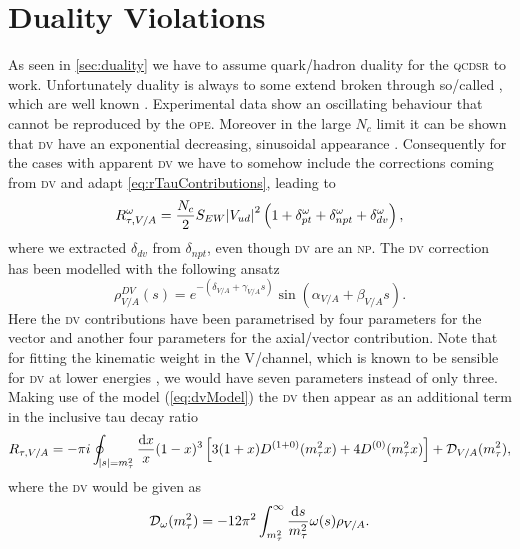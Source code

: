 \documentclass[../../index.tex]{subfiles}
\begin{document}
\section{Duality Violations}
As seen in \cref{sec:duality} we have to assume quark\-/hadron duality for the
\textsc{qcdsr} to work. Unfortunately duality is always to some extend broken
through so\-/called , which are well known
\cite{Cata2008,Cata2009}. Experimental data show an oscillating behaviour that
cannot be reproduced by the \textsc{ope}. Moreover in the large \(N_c\) limit it
can be shown that \textsc{dv} have an exponential decreasing, sinusoidal
appearance \cite{Cata2005}. Consequently for the cases with apparent \textsc{dv}
we have to somehow include the corrections coming from \textsc{dv} and adapt
\cref{eq:rTauContributions}, leading to
\begin{equation}
  R_{\tau,V/A}^\omega = \frac{N_c}{2}S_{EW} \abs{V_{ud}}^2 \left( 1 + \delta_{pt}^{\omega} + \delta_{npt}^{\omega} + \delta_{dv}^{\omega} \right),
\end{equation}
where we extracted \(\delta_{dv}\) from \(\delta_{npt}\), even though
\textsc{dv} are an \textsc{np}. The \textsc{dv} correction has been modelled
\cite{Cata2009} with the following ansatz
\begin{equation}
  \label{eq:dvModel}
  \rho_{V/A}^{DV}(s) = e^{-(\delta_{V/A}+\gamma_{V/A}s)} \sin(\alpha_{V/A} + \beta_{V/A}s).
\end{equation}
Here the \textsc{dv} contributions have been parametrised by four parameters for
the vector and another four parameters for the axial\-/vector contribution. Note
that for fitting the kinematic weight in the \textsc{V}\-/channel, which is
known to be sensible for \textsc{dv} at lower energies \cite{Boito2011a}, we
would have seven parameters instead of only three. Making use of the model
(\cref{eq:dvModel}) the \textsc{dv} then appear as an additional term in the
inclusive tau decay ratio
\begin{equation}
  R_{\tau,V/A} = - \pi i \oint_{\abs{s}=m_\tau^2} \frac{\dif x}{x} (1 - x)^3 \left[ 3
    (1 + x) D^{(1+0)}(m_\tau^2 x) + 4 D^{(0)}(m_\tau^2 x) \right] +  \mathcal{D}_{V/A}(m_\tau^2),
\end{equation}
where the \textsc{dv} would be given as
\begin{equation}
  \mathcal{D}_\omega(m_\tau^2) = -12 \pi^2 \int_{m_\tau^2}^\infty \frac{\dif s}{m_\tau^2} \omega(s) \rho_{V/A}.
\end{equation}
\end{document}
